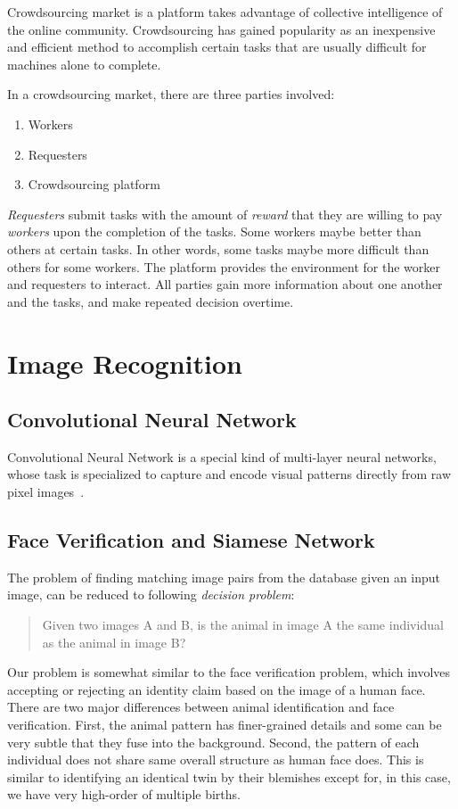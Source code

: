 Crowdsourcing market is a platform takes advantage of collective intelligence
of the online community. Crowdsourcing has gained popularity as an inexpensive
and efficient method to accomplish certain tasks that are usually difficult for
machines alone to complete.

In a crowdsourcing market, there are three parties involved:
\begin{enumerate}
	\item Workers
	\item Requesters
	\item Crowdsourcing platform
\end{enumerate}

\emph{Requesters} submit tasks with the amount of \emph{reward} that they are
willing to pay \emph{workers} upon the completion of the tasks. Some workers
maybe better than others at certain tasks. In other words, some tasks maybe
more difficult than others for some workers. The platform provides the
environment for the worker and requesters to interact. All parties gain more
information about one another and the tasks, and make repeated decision
overtime.

\section{Image Recognition}

\subsection{Convolutional Neural Network}

Convolutional Neural Network is a special kind of multi-layer neural networks,
whose task is specialized to capture and encode visual patterns directly from
raw pixel images~\cite{lecun95}.

\subsection{Face Verification and Siamese Network}

The problem of finding matching image pairs from the database given an input
image, can be reduced to following \emph{decision problem}:
\begin{quote}
\centering
Given two images A and B, is the animal in image A the same individual as the
animal in image B?
\end{quote}

Our problem is somewhat similar to the face verification problem, which
involves accepting or rejecting an identity claim based on the image of a human
face. There are two major differences between animal identification and face
verification. First, the animal pattern has finer-grained details and some can
be very subtle that they fuse into the background. Second, the pattern of each
individual does not share same overall structure as human face does. This is
similar to identifying an identical twin by their blemishes except for, in this
case, we have very high-order of multiple births.

